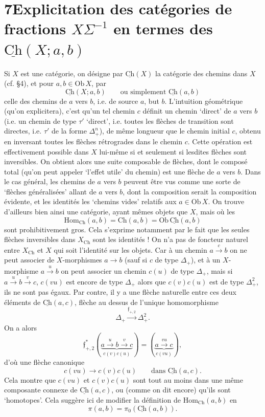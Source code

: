 \documentclass[11pt]{article}
\newcommand{\printedpage}[1]{\marginpar{\footnotesize p.~#1}}
\newcommand{\msp}[1]{\marginpar{\footnotesize [#1]}}
\newcommand{\Ch}{\underline{\mathrm{Ch}}}
\begin{document}
\printedpage{40}
\section*{7\quad Explicitation des catégories de fractions $X\Sigma^{-1}$ en termes des $\Ch(X;a,b)$}

Si $X$ est une catégorie, on désigne par $\Ch(X)$ la catégorie des chemins dans $X$ (cf. §4), et pour $a,b \in \mathrm{Ob}\,X$, par
\[
\Ch(X;a,b) \qquad \text{ou simplement } \Ch(a,b)
\]
celle des chemins de $a$ vers $b$, i.e. de source $a$, but $b$. L'intuition géométrique (qu'on explicitera), c'est qu'un tel chemin $c$ définit un chemin `direct' de $a$ vers $b$ (i.e. un chemin de type $\tau'$ `direct', i.e. toutes les flèches de transition sont directes, i.e. $\tau'$ de la forme $\Delta_+^n$), de même longueur que le chemin initial $c$, obtenu en inversant toutes les flèches rétrogrades dans le chemin $c$. Cette opération est effectivement possible dans $X$ lui-même si et seulement si lesdites flèches sont inversibles. On obtient alors une suite composable de flèches, dont le composé total (qu'on peut appeler `l'effet utile' du chemin)
\msp{page 60}
est une flèche de $a$ vers $b$. Dans le cas général, les chemins de $a$ vers $b$ peuvent être vus comme une sorte de `flèches généralisées' allant de $a$ vers $b$, dont la composition serait la composition évidente, et les identités les `chemins vides' relatifs aux $a \in \mathrm{Ob}\,X$. On trouve d'ailleurs bien ainsi une catégorie, ayant mêmes objets que $X$, mais où les
\[
\mathrm{Hom}_{\mathrm{Ch}}(a,b) = \mathrm{Ch}(a,b) = \mathrm{Ob}\,\Ch(a,b)
\]
sont prohibitivement gros. Cela s'exprime notamment par le fait que les seules flèches inversibles dans $X_{\mathrm{Ch}}$ sont les identités ! On n'a pas de foncteur naturel entre $X_{\mathrm{Ch}}$ et $X$ qui soit l'identité sur les objets. Car à un chemin $a \xrightarrow{c} b$ on ne peut associer de $X$-morphismes $a \longrightarrow b$ (sauf si $c$ de type $\Delta_+$), et à un $X$-morphisme $a \xrightarrow{u} b$ on peut associer un chemin $c(u)$ de type $\Delta_+$, mais si $a \xrightarrow{u} b \xrightarrow{v} c$, $c(vu)$ est encore de type $\Delta_+$ alors que $c(v)c(u)$ est de type $\Delta_+^2$, ils ne sont pas égaux. Par contre, il y a une flèche naturelle entre ces deux éléments de $\Ch(a,c)$, flèche au dessus de l'unique homomorphisme
\[
\Delta_+ \xrightarrow{\mathfrak{f}_{+,2}} \Delta_+^2.
\]
\msp{page 61}
On a alors
\[
\mathfrak{f}_{+,2}^*(\underbrace{a \xrightarrow{u} b \xrightarrow{v} c}_{c(v)c(u)}) = (\underbrace{a \xrightarrow{vu} c}_{c(vu)}),
\]
d'où une flèche canonique
\[
c(vu) \longrightarrow c(v)c(u) \qquad \text{dans } \Ch(a,c).
\]
Cela montre que $c(vu)$ et $c(v)c(u)$ sont tout au moins dans une même composante connexe de $\Ch(a,c)$, ou (comme on dit encore) qu'ils sont `homotopes'. Cela suggère ici de modifier la définition de $\mathrm{Hom}_{\mathrm{Ch}}(a,b)$ en
\[
\pi(a,b) = \pi_0(\Ch(a,b)).
\]
\end{document}
